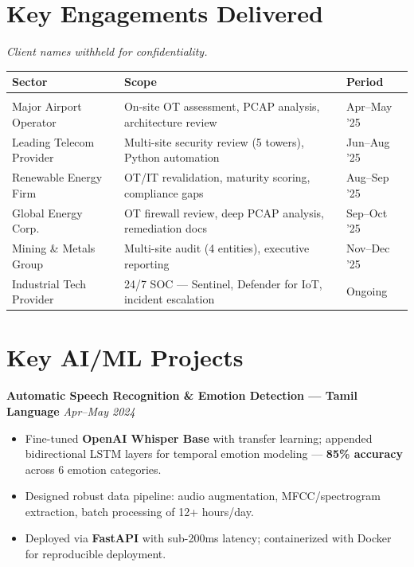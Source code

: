 \documentclass[10.5pt,a4paper]{article}
\begin{document}
\section{Key Engagements Delivered}
\textit{Client names withheld for confidentiality.}\\[3pt]
\begin{tabular}{@{} p{3.4cm} p{9.5cm} p{2cm} @{}}
\textbf{Sector} & \textbf{Scope} & \textbf{Period}\\[2pt]
\hline\\[-7pt]
Major Airport Operator & On-site OT assessment, PCAP analysis, architecture review & Apr–May '25\\[2pt]
Leading Telecom Provider & Multi-site security review (5 towers), Python automation & Jun–Aug '25\\[2pt]
Renewable Energy Firm & OT/IT revalidation, maturity scoring, compliance gaps & Aug–Sep '25\\[2pt]
Global Energy Corp. & OT firewall review, deep PCAP analysis, remediation docs & Sep–Oct '25\\[2pt]
Mining \& Metals Group & Multi-site audit (4 entities), executive reporting & Nov–Dec '25\\[2pt]
Industrial Tech Provider & 24/7 SOC — Sentinel, Defender for IoT, incident escalation & Ongoing\\
\end{tabular}

\section{Key AI/ML Projects}

\textbf{Automatic Speech Recognition \& Emotion Detection — Tamil Language} \hfill \textit{Apr–May 2024}
\begin{itemize}
  \item Fine-tuned \textbf{OpenAI Whisper Base} with transfer learning; appended bidirectional LSTM layers for temporal emotion modeling — \textbf{85\% accuracy} across 6 emotion categories.
  \item Designed robust data pipeline: audio augmentation, MFCC/spectrogram extraction, batch processing of 12+ hours/day.
  \item Deployed via \textbf{FastAPI} with sub-200ms latency; containerized with Docker for reproducible deployment.
\end{itemize}
\end{document}
